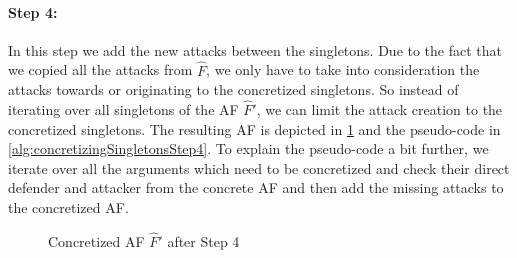 \paragraph{Step 4:} In this step we add the new attacks between the singletons. Due to the fact that we copied all the attacks from $\hat{F}$, we only have to take into consideration the attacks towards or originating to the concretized singletons. So instead of iterating over all singletons of the AF $\hat{F}'$, we can limit the attack creation to the concretized singletons. The resulting AF is depicted in \cref{example:algorithmConcretizeSingletonsStep4} and the pseudo-code in \cref{alg:concretizingSingletonsStep4}. To explain the pseudo-code a bit further, we iterate over all the arguments which need to be concretized and check their direct defender and attacker from the concrete AF and then add the missing attacks to the concretized AF.


\vspace{0.3cm}
\begin{figure}[h]
    \centering
    \caption{Concretized AF $\hat{F}'$ after Step 4}
    \label{example:algorithmConcretizeSingletonsStep4}
\end{figure}
\vspace{-0.2cm}


